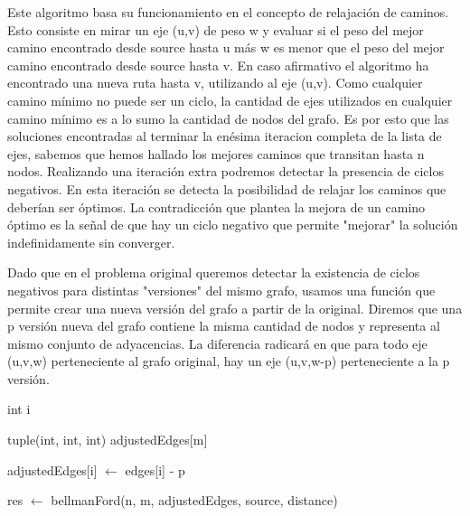 Este algoritmo basa su funcionamiento en el concepto de relajación de caminos. Esto consiste en mirar un eje (u,v) de peso w y evaluar si el peso del mejor camino encontrado desde source hasta u más w es menor que el peso del mejor camino encontrado desde source hasta v. En caso afirmativo el algoritmo ha encontrado una nueva ruta hasta v, utilizando al eje (u,v). Como cualquier camino mínimo no puede ser un ciclo, la cantidad de ejes utilizados en cualquier camino mínimo es a lo sumo la cantidad de nodos del grafo. Es por esto que las soluciones encontradas al terminar la enésima iteracion completa de la lista de ejes, sabemos que hemos hallado los mejores caminos que transitan hasta n nodos. Realizando una iteración extra podremos detectar la presencia de ciclos negativos. En esta iteración se detecta la posibilidad de relajar los caminos que deberían ser óptimos. La contradicción que plantea la mejora de un camino óptimo es la señal de que hay un ciclo negativo que permite "mejorar" la solución indefinidamente sin converger.
\\
\par
Dado que en el problema original queremos detectar la existencia de ciclos negativos para distintas "versiones" del mismo grafo, usamos una función que permite crear una nueva versión del grafo a partir de la original. Diremos que una p versión nueva del grafo contiene la misma cantidad de nodos y representa al mismo conjunto de adyacencias. La diferencia radicará en que para todo eje (u,v,w) perteneciente al grafo original, hay un eje (u,v,w-p) perteneciente a la p versión.

\begin{algorithm}[H]
		\NoCaptionOfAlgo
		\caption{}
		
		int i
		
		tuple(int, int, int) adjustedEdges[m] 
		
		\For{i in [0..m)}
		{
			adjustedEdges[i] $\leftarrow$ edges[i] - p	
		}

		res $\leftarrow$ bellmanFord(n, m, adjustedEdges, source, distance)		

	\end{algorithm}

